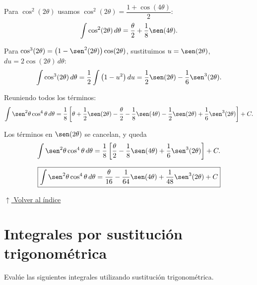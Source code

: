 \documentclass[12pt]{article}
\newcommand{\volverindice}{%
    \vspace{1em}%
    \begin{flushright}%
        \hyperlink{indice}{\small $\uparrow$ Volver al índice}%
    \end{flushright}%
}
\begin{document}
\begin{enumerate}[label=\alph*.-]
    Para $\cos^2(2\theta)$ usamos $\cos^2(2\theta)=\dfrac{1+\cos(4\theta)}{2}$:
    \[
    \int\cos^2(2\theta)\,d\theta=\frac{\theta}{2}+\frac18\sen(4\theta).
    \]

    Para $\cos^3(2\theta)=\left(1-\sen^2(2\theta)\right)\cos(2\theta)$,
    sustituimos $u=\sen(2\theta)$, $du=2\cos(2\theta)\,d\theta$:
    \[
    \int\cos^3(2\theta)\,d\theta=\frac12\int\left(1-u^2\right)du
    =\frac12\sen(2\theta)-\frac16\sen^3(2\theta).
    \]

    Reuniendo todos los términos:
    \[
    \int\sen^2\theta\cos^4\theta\,d\theta
    =\frac18\left[\theta+\frac12\sen(2\theta)
    -\frac{\theta}{2}-\frac18\sen(4\theta)
    -\frac12\sen(2\theta)+\frac16\sen^3(2\theta)\right]+C.
    \]

    Los términos en $\sen(2\theta)$ se cancelan, y queda
    \[
    \int\sen^2\theta\cos^4\theta\,d\theta
    =\frac18\left[\frac{\theta}{2}-\frac18\sen(4\theta)+\frac16\sen^3(2\theta)\right]+C.
    \]

    \[
    \boxed{
    \int\sen^2\theta\cos^4\theta\,d\theta
    =\frac{\theta}{16}-\frac{1}{64}\sen(4\theta)+\frac{1}{48}\sen^3(2\theta)+C
    }
    \]

\end{enumerate}

\volverindice
\newpage


\section{Integrales por sustitución trigonométrica}

Evalúe las siguientes integrales utilizando sustitución trigonométrica.
\end{document}
